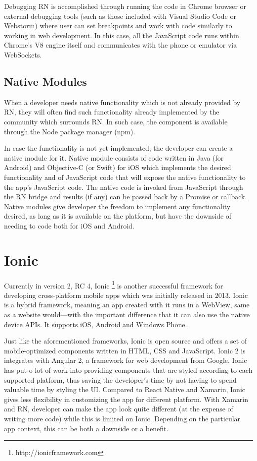 Debugging RN is accomplished through running the code in Chrome browser or external debugging tools (such as those included with Visual Studio Code or Webstorm) where user can set breakpoints and work with code similarly to working in web development. In this case, all the JavaScript code runs within Chrome's V8 engine itself and communicates with the phone or emulator via WebSockets.


\subsection{Native Modules}

When a developer needs native functionality which is not already provided by RN, they will often find such functionality already implemented by the community which surrounds RN. In such case, the component is available through the Node package manager (npm).

In case the functionality is not yet implemented, the developer can create a native module  \cite{rn:nativemodules} for it. Native module consists of code written in Java (for Android) and Objective-C (or Swift) for iOS which implements the desired functionality and of JavaScript code that will expose the native functionality to the app's JavaScript code. The native code is invoked from JavaScript through the RN bridge and results (if any) can be passed back by a Promise or callback. Native modules give developer the freedom to implement any functionality desired, as long as it is available on the platform, but have the downside of needing to code both for iOS and Android.


\section{Ionic}

Currently in version 2, RC 4, Ionic \footnote{http://ionicframework.com} is another successful framework for developing cross-platform mobile apps which was initially released in 2013. Ionic is a hybrid framework, meaning an app created with it runs in a WebView, same as a website would---with the important difference that it can also use the native device APIs. It supports iOS, Android and Windows Phone.

Just like the aforementioned frameworks, Ionic is open source and offers a set of mobile-optimized components written in HTML, CSS and JavaScript. Ionic 2 is integrates with Angular 2, a framework for web development from Google. Ionic has put o lot of work into providing components that are styled according to each supported platform, thus saving the developer's time by not having to spend valuable time by styling the UI. Compared to React Native and Xamarin, Ionic gives less flexibility in customizing the app for different platform. With Xamarin and RN, developer can make the app look quite different (at the expense of writing more code) while this is limited on Ionic. Depending on the particular app context, this can be both a downside or a benefit.

